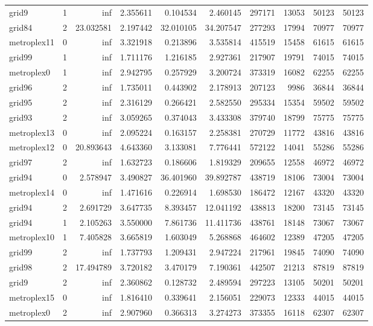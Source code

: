 \begin{longtable}{|l|r|r|r|r|r|r|r|r|r|}
grid9 & 1 & inf & 2.355611 & 0.104534 & 2.460145 & 297171 & 13053 & 50123 & 50123 \\
grid84 & 2 & 23.032581 & 2.197442 & 32.010105 & 34.207547 & 277293 & 17994 & 70977 & 70977 \\
metroplex11 & 0 & inf & 3.321918 & 0.213896 & 3.535814 & 415519 & 15458 & 61615 & 61615 \\
grid99 & 1 & inf & 1.711176 & 1.216185 & 2.927361 & 217907 & 19791 & 74015 & 74015 \\
metroplex0 & 1 & inf & 2.942795 & 0.257929 & 3.200724 & 373319 & 16082 & 62255 & 62255 \\
grid96 & 2 & inf & 1.735011 & 0.443902 & 2.178913 & 207123 & 9986 & 36844 & 36844 \\
grid95 & 2 & inf & 2.316129 & 0.266421 & 2.582550 & 295334 & 15354 & 59502 & 59502 \\
grid93 & 2 & inf & 3.059265 & 0.374043 & 3.433308 & 379740 & 18799 & 75775 & 75775 \\
metroplex13 & 0 & inf & 2.095224 & 0.163157 & 2.258381 & 270729 & 11772 & 43816 & 43816 \\
metroplex12 & 0 & 20.893643 & 4.643360 & 3.133081 & 7.776441 & 572122 & 14041 & 55286 & 55286 \\
grid97 & 2 & inf & 1.632723 & 0.186606 & 1.819329 & 209655 & 12558 & 46972 & 46972 \\
grid94 & 0 & 2.578947 & 3.490827 & 36.401960 & 39.892787 & 438719 & 18106 & 73004 & 73004 \\
metroplex14 & 0 & inf & 1.471616 & 0.226914 & 1.698530 & 186472 & 12167 & 43320 & 43320 \\
grid94 & 2 & 2.691729 & 3.647735 & 8.393457 & 12.041192 & 438813 & 18200 & 73145 & 73145 \\
grid94 & 1 & 2.105263 & 3.550000 & 7.861736 & 11.411736 & 438761 & 18148 & 73067 & 73067 \\
metroplex10 & 1 & 7.405828 & 3.665819 & 1.603049 & 5.268868 & 464602 & 12389 & 47205 & 47205 \\
grid99 & 2 & inf & 1.737793 & 1.209431 & 2.947224 & 217961 & 19845 & 74090 & 74090 \\
grid98 & 2 & 17.494789 & 3.720182 & 3.470179 & 7.190361 & 442507 & 21213 & 87819 & 87819 \\
grid9 & 2 & inf & 2.360862 & 0.128732 & 2.489594 & 297223 & 13105 & 50201 & 50201 \\
metroplex15 & 0 & inf & 1.816410 & 0.339641 & 2.156051 & 229073 & 12333 & 44015 & 44015 \\
metroplex0 & 2 & inf & 2.907960 & 0.366313 & 3.274273 & 373355 & 16118 & 62307 & 62307 \\

\end{longtable}
